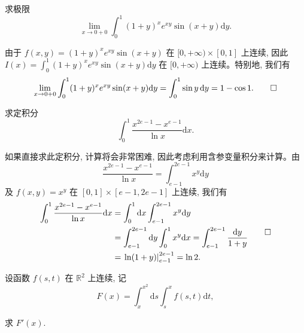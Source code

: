 \begin{example}\label{example:ma-17-1-1}
求极限
\[
  \lim_{x\to0+0}\int_0^1 (1+y)^x e^{xy}\sin(x+y)\mathrm dy.
\]
\end{example}


\begin{solve}
由于 $f(x,y)=(1+y)^x e^{xy}\sin(x+y)$ 在 $[0,+\infty)\times[0,1]$ 上连续, 因此 $I(x)=\int_0^1(1+y)^x e^{xy}\sin(x+y)\mathrm dy$ 在 $[0,+\infty)$ 上连续。特别地, 我们有
\[
  \lim_{x\to0+0}\int_0^1 (1+y)^x e^{xy}\sin(x+y)\mathrm dy
  =\int_0^1 \sin y\,\mathrm dy
  =1-\cos1.
\qedhere
\]
\end{solve}


\begin{example}\label{example:ma-17-1-2}
求定积分
\[
  \int_0^1 \frac{x^{2e-1}-x^{e-1}}{\ln x}\mathrm dx.
\]
\end{example}


\begin{solve}
如果直接求此定积分, 计算将会非常困难, 因此考虑利用含参变量积分来计算。由
\[
  \frac{x^{2e-1}-x^{e-1}}{\ln x}
  =
  \int_{e-1}^{2e-1} x^y\mathrm dy
\]
及 $f(x,y)=x^y$ 在 $[0,1]\times[e-1,2e-1]$ 上连续, 我们有
\[
\begin{aligned}
  \int_0^1 \frac{x^{2e-1}-x^{e-1}}{\ln x}\mathrm dx
  &=\int_0^1 \mathrm dx\int_{e-1}^{2e-1}x^y\mathrm dy\\
  &=\int_{e-1}^{2e-1}\mathrm dy\int_0^1x^y\mathrm dx
    =\int_{e-1}^{2e-1}\frac{\mathrm dy}{1+y}\\
  &=\left.\ln(1+y)\right|_{e-1}^{2e-1}=\ln2.
\end{aligned}
\qedhere
\]
\end{solve}


\begin{example}\label{example:ma-17-1-3}
设函数 $f(s,t)$ 在 $\mathbb R^2$ 上连续, 记
\[
  F(x)=\int_x^{x^2}\mathrm ds\int_s^x f(s,t)\mathrm dt,
\]
\end{example}

\noindent 求 $F'(x)$.


